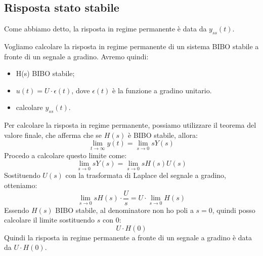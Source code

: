 \subsection{Risposta stato stabile}
Come abbiamo detto, la risposta in regime permanente è data da $y_{ss}(t)$.
\begin{tcolorbox}[title=Esempio funzione a gradino]
    Vogliamo calcolare la risposta in regime permanente di un sistema BIBO stabile a fronte di un segnale a gradino.
    Avremo quindi:
    \begin{itemize}
        \item H(s) BIBO stabile;
        \item $u(t) = U \cdot \epsilon(t)$, dove $\epsilon(t)$ è la funzione a gradino unitario.
        \item calcolare $y_{ss}(t)$.
    \end{itemize}
    Per calcolare la risposta in regime permanente, possiamo utilizzare il teorema del valore finale, che afferma che se $H(s)$ è BIBO stabile, allora:
    \begin{equation}
        \lim_{t \to \infty} y(t) = \lim_{s \to 0} sY(s)
    \end{equation}
    Procedo a calcolare questo limite come:
    \begin{equation}
        \lim_{s \to 0} sY(s) = \lim_{s \to 0} sH(s)U(s)
    \end{equation}
    Sostituendo $U(s)$ con la trasformata di Laplace del segnale a gradino, otteniamo:
    \begin{equation}
        \lim_{s \to 0} sH(s) \cdot \frac{U}{s} = U \cdot \lim_{s \to 0} H(s)
    \end{equation}
    Essendo $H(s)$ BIBO stabile, al denominatore non ho poli a $s=0$, quindi posso calcolare il limite sostituendo $s$ con $0$:
    \begin{equation}
        U \cdot H(0)
    \end{equation}
    Quindi la risposta in regime permanente a fronte di un segnale a gradino è data da $U \cdot H(0)$.
\end{tcolorbox}
